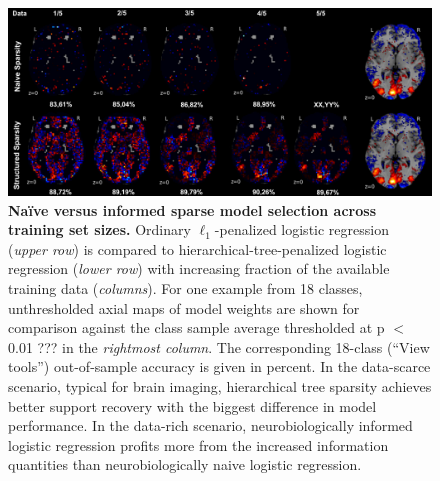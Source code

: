 \documentclass{article} %
\begin{document}
\begin{figure}
\begin{centering}
\includegraphics[width=1.00\textwidth]{figures/dataratio.pdf}
\end{centering}
\vspace{-0.6cm}
\caption{\textbf{Na\"ive versus informed sparse model selection
across training set sizes.}
Ordinary $\ell_1$-penalized logistic regression
(\textit{upper row})
is compared
to hierarchical-tree-penalized logistic regression
(\textit{lower row})
with increasing fraction
of the available training data (\textit{columns}).
For one example from 18 classes,
unthresholded axial maps of model weights
are shown for comparison against
the class sample average {\color{red} thresholded at p $<$ 0.01 ???}
in the \textit{rightmost column}.
The corresponding 18-class (``View tools'')
out-of-sample accuracy
is given in percent.
%
In the data-scarce scenario,
typical for brain imaging,
hierarchical tree sparsity achieves
better support recovery with the biggest difference
in model performance.
%
In the data-rich scenario,
neurobiologically informed logistic regression
profits more from the increased information quantities than
neurobiologically naive logistic regression.
}
\label{fig_dataratio}
\end{figure}
\end{document}
